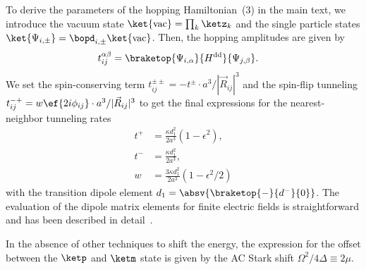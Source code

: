 To derive the parameters of the hopping Hamiltonian~(3) in the main text, we introduce the vacuum state $\ket{\text{vac}}=\prod_k \ketz_k$ and the single particle states $\ket{\Psi_{i,\pm}}=\bopd_{i,\pm} \ket{\text{vac}}$.
Then, the hopping amplitudes are given by
\begin{align}
    t^{\alpha\beta}_{ij} &= \braketop{\Psi_{i,\alpha}}{H^\text{dd}}{\Psi_{j,\beta}}.
\end{align}
We set the spin-conserving term $t^{\pm\pm}_{ij}=-t^\pm \cdot a^3/|\vec{R}_{ij}|^3$ and the spin-flip tunneling $t^{-+}_{ij}=w \ef{2i \phi_{ij}} \cdot a^3/|\vec{R}_{ij}|^3$ to get the final expressions for the nearest-neighbor tunneling rates
\begin{align}
    t^+ &= \frac{\kappa d_{1}^2}{2a^3} (1 - \epsilon^2), \nonumber \\
    t^- &= \frac{\kappa d_{1}^2}{2a^3}, \nonumber \\
    w &= \frac{3 \kappa d_{1}^2}{2a^3} (1-\epsilon^2/2)
\end{align}
with the transition dipole element $d_{1}=\absv{\braketop{-}{d^{-\vphantom{0}}}{{0}}}$.
The evaluation of the dipole matrix elements for finite electric fields is straightforward and has been described in detail~\cite{Micheli2007}.

In the absence of other techniques to shift the energy, the expression for the offset between the $\ketp$ and $\ketm$ state is given by the AC Stark shift $\Omega^2/4\Delta\equiv 2\mu$.

